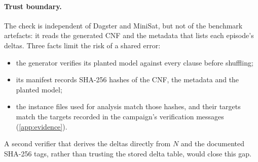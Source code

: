 \documentclass[11pt,a4paper]{article}
\begin{document}
\paragraph{Trust boundary.}
The check is independent of Dagster and MiniSat, but not of the benchmark artefacts: it reads
the generated CNF and the metadata that lists each episode's deltas. Three facts limit the
risk of a shared error:
\begin{itemize}
\item the generator verifies its planted model against every clause before shuffling;
\item its manifest records SHA-256 hashes of the CNF, the metadata and the planted model;
\item the instance files used for analysis match those hashes, and their targets match the
      targets recorded in the campaign's verification messages (\cref{app:evidence}).
\end{itemize}
A second verifier that derives the deltas directly from $N$ and the documented SHA-256 tags,
rather than trusting the stored delta table, would close this gap.
\end{document}

